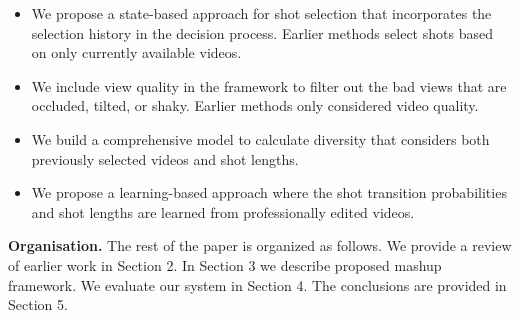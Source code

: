 \documentclass{sig-alternate}
\begin{document}
{{{\begin{itemize}
    \item We propose a state-based approach for shot selection that incorporates
the selection history in the decision process. Earlier methods select shots based on only currently available
videos.
  \item We include view quality in the framework to filter out the
bad views that are occluded, tilted, or shaky. Earlier methods
only considered video quality.
  \item We build a comprehensive model to calculate diversity that
considers both previously selected videos and shot lengths.
  \item We propose a learning-based approach where the shot transition
probabilities and shot lengths are learned from professionally
edited videos.
\end{itemize}
\textbf{Organisation. }The rest of the paper is organized as follows.
We provide a review of earlier work in Section 2. In Section 3 we
describe proposed mashup framework. We evaluate our system in
Section 4. The conclusions are provided in Section 5.

}}}
\end{document}
